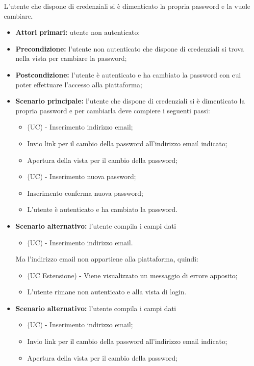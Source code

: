L'utente che dispone di credenziali si è dimenticato la propria password e la vuole cambiare.
\begin{itemize}
    \item \textbf{Attori primari:} utente non autenticato;
    \item \textbf{Precondizione:} l'utente non autenticato che dispone di credenziali si trova nella vista per cambiare la password;
    \item \textbf{Postcondizione:} l'utente è autenticato e ha cambiato la password con cui poter effettuare l'accesso alla piattaforma;
    \item \textbf{Scenario principale:} l'utente che dispone di credenziali si è dimenticato la propria password e per cambiarla deve compiere i seguenti passi:
    \begin{itemize}
        \item (UC) - Inserimento indirizzo email;
        \item Invio link per il cambio della password all'indirizzo email indicato;
        \item Apertura della vista per il cambio della password;
        \item (UC) - Inserimento nuova password;
        \item Inserimento conferma nuova password;
        \item L'utente è autenticato e ha cambiato la password.
    \end{itemize}
	\item \textbf{Scenario alternativo:} l'utente compila i campi dati
	\begin{itemize}
		\item (UC) - Inserimento indirizzo email.
	\end{itemize}
	Ma l'indirizzo email non appartiene alla piattaforma, quindi:
	\begin{itemize}
		\item (UC Estensione) - Viene visualizzato un messaggio di errore apposito;
		\item L'utente rimane non autenticato e alla vista di login.
	\end{itemize}
	\item \textbf{Scenario alternativo:} l'utente compila i campi dati
	\begin{itemize}
		\item (UC) - Inserimento indirizzo email;
		\item Invio link per il cambio della password all'indirizzo email indicato;
		\item Apertura della vista per il cambio della password;

\end{itemize}
\end{itemize}
